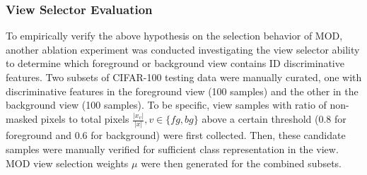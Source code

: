\subsubsection{View Selector Evaluation}
To empirically verify the above hypothesis on the selection behavior of MOD, another ablation experiment was conducted investigating the view selector ability to determine which foreground or background view contains ID discriminative features.
Two subsets of CIFAR-100 testing data were manually curated, one with discriminative features in the foreground view (100 samples) and the other in the background view (100 samples). To be specific, view samples with ratio of non-masked pixels to total pixels $\frac{\lvert x_v \rvert}{\lvert x \rvert}, v \in \{fg, bg\}$ above a certain threshold (0.8 for foreground and 0.6 for background) were first collected. Then, these candidate samples were manually verified for sufficient class representation in the view. MOD view selection weights $\mu$ were then generated for the combined subsets. 
\vspace{3cm}

\begin{table}[htp!]
\small
\centering
\caption{
View selector foreground-selection frequency on CIFAR-100 testing ID and OOD datasets.}
\label{tab:propwork-mod-results_view_selector_freqs}
\end{table}


